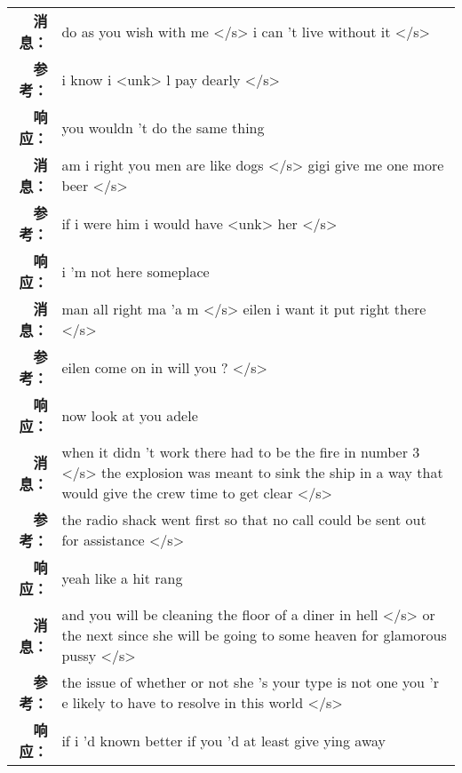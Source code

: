 \begin{tabularx}{0.8\textwidth}{@{}rX@{}}%
\toprule%
\midrule%
\textbf{消息：}&do as you wish with me </s> i can 't live without it  </s>\\%
\textbf{参考：}& i know i <unk> l pay dearly </s>\\%
\textbf{响应：}&you wouldn 't do the same thing\\%
\midrule%
\textbf{消息：}&am i right you men are like dogs </s> gigi give me one more beer  </s>\\%
\textbf{参考：}& if i were him i would have <unk> her </s>\\%
\textbf{响应：}&i 'm not here someplace\\%
\midrule%
\textbf{消息：}&man all right ma 'a m </s> eilen i want it put right there  </s>\\%
\textbf{参考：}& eilen come on in will you ? </s>\\%
\textbf{响应：}&now look at you adele\\%
\midrule%
\textbf{消息：}&when it didn 't work there had to be the fire in number 3 </s> the explosion was meant to sink the ship in a way that would give the crew time to get clear  </s>\\%
\textbf{参考：}& the radio shack went first so that no call could be sent out for assistance </s>\\%
\textbf{响应：}&yeah like a hit rang\\%
\midrule%
\textbf{消息：}&and you will be cleaning the floor of a diner in hell </s> or the next since she will be going to some heaven for glamorous pussy  </s>\\%
\textbf{参考：}& the issue of whether or not she 's your type is not one you 'r e likely to have to resolve in this world </s>\\%
\textbf{响应：}&if i 'd known better if you 'd at least give ying away\\%
\midrule\bottomrule%
%
\end{tabularx}